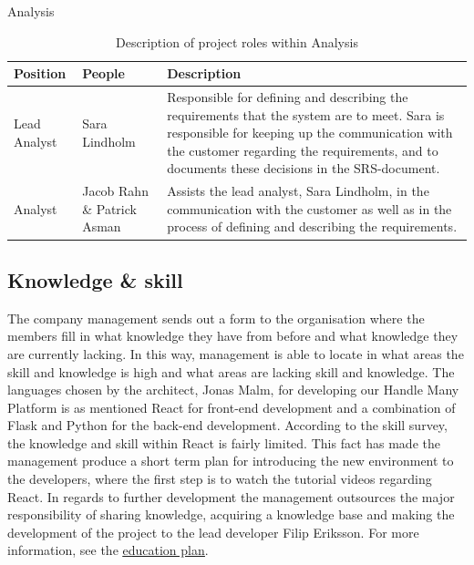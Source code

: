 \begin{table}[!hbtp]

\begin{center}
\begin{huge}
    Analysis
\end{huge}
\begin{tabular}{ | m{4cm} |m{3cm} |m{10cm}| } 
\hline
\textbf{Position} & \textbf{People} & \textbf{Description} \\ 
\hline
Lead Analyst & Sara Lindholm & Responsible for defining and describing the requirements that the system are to meet. Sara is responsible for keeping up the communication with the customer regarding the requirements, and to documents these decisions in the SRS-document.  \\
\hline
Analyst & Jacob Rahn \& Patrick Asman & Assists the lead analyst, Sara Lindholm, in the communication with the customer as well as in the process of defining and describing the requirements. \\
\hline
\end{tabular}


\end{center}
\caption{\label{tab:table-name}Description of project roles within Analysis}

\end{table}

\subsection{Knowledge \& skill}
The company management sends out a form to the organisation where the members fill in what knowledge they have from before and what knowledge they are currently lacking. In this way, management is able to locate in what areas the skill and knowledge is high and what areas are lacking skill and knowledge. The languages chosen by the architect, Jonas Malm, for developing our Handle Many Platform is as mentioned React for front-end development and a combination of Flask and Python for the back-end development. According to the skill survey, the knowledge and skill within React is fairly limited. This fact has made the management produce a short term plan for introducing the new environment to the developers, where the first step is to watch the tutorial videos regarding React. In regards to further development the management outsources the major responsibility of sharing knowledge, acquiring a knowledge base and making the development of the project to the lead developer Filip Eriksson. For more information, see the \href{https://gitlab.liu.se/tddc88-company-3-2020/deploy/-/tree/Document_branch/Education_plan}{\underline{education plan}}. 

